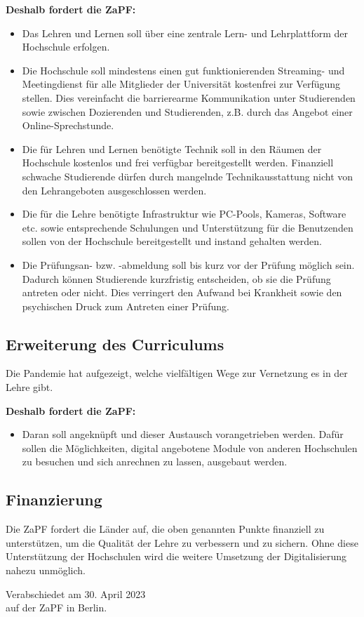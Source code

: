 \documentclass[DIV=calc]{scrartcl}
\begin{document}
\textbf{Deshalb fordert die ZaPF:}
\begin{itemize}
\item Das Lehren und Lernen soll über eine zentrale Lern- und Lehrplattform der Hochschule erfolgen.
\item Die Hochschule soll mindestens einen gut funktionierenden Streaming- und Meetingdienst für alle Mitglieder der Universität kostenfrei zur Verfügung stellen. Dies vereinfacht die barrierearme Kommunikation unter Studierenden sowie zwischen Dozierenden und Studierenden, z.B. durch das Angebot einer Online-Sprechstunde. 
\item Die für Lehren und Lernen benötigte Technik soll in den Räumen der Hochschule kostenlos und frei verfügbar bereitgestellt werden. Finanziell schwache Studierende dürfen durch mangelnde Technikausstattung nicht von den Lehrangeboten ausgeschlossen werden.
\item Die für die Lehre benötigte Infrastruktur wie PC-Pools, Kameras, Software etc. sowie entsprechende Schulungen und Unterstützung für die Benutzenden sollen von der Hochschule bereitgestellt und instand gehalten werden.
\item Die Prüfungsan- bzw. -abmeldung soll bis kurz vor der Prüfung möglich sein. Dadurch können Studierende kurzfristig entscheiden, ob sie die Prüfung antreten oder nicht. Dies verringert den Aufwand bei Krankheit sowie den psychischen Druck zum Antreten einer Prüfung. 
\end{itemize}

\subsection*{Erweiterung des Curriculums}
Die Pandemie hat aufgezeigt, welche vielfältigen Wege zur Vernetzung es in der Lehre gibt.

\textbf{Deshalb fordert die ZaPF:}
\begin{itemize}
    \item Daran soll angeknüpft und dieser Austausch vorangetrieben werden. Dafür sollen die Möglichkeiten, digital angebotene Module von anderen Hochschulen zu besuchen und sich anrechnen zu lassen, ausgebaut werden. 
\end{itemize}

\subsection*{Finanzierung}
Die ZaPF fordert die Länder auf, die oben genannten Punkte finanziell zu unterstützen, um die Qualität der Lehre zu verbessern und zu sichern. Ohne diese Unterstützung der Hochschulen wird die weitere Umsetzung der Digitalisierung nahezu unmöglich.

\vspace{1cm} 

\vfill
\begin{flushright}
	Verabschiedet am 30. April 2023 \\
	auf der ZaPF in Berlin.
\end{flushright}
\end{document}
